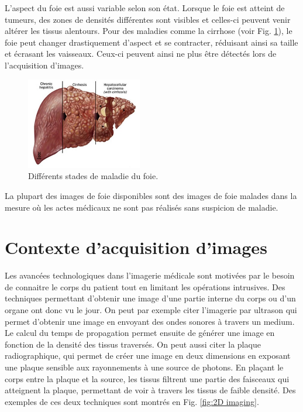 L'aspect du foie est aussi variable selon son état. Lorsque le foie est atteint de tumeurs, des zones de densités différentes sont visibles et celles-ci peuvent venir altérer les tissus alentours. Pour des maladies comme la cirrhose (voir Fig. \ref{fig:unhealthy liver}), le foie peut changer drastiquement d'aspect et se contracter, réduisant ainsi sa taille et écrasant les vaisseaux. Ceux-ci peuvent ainsi ne plus être détectés lors de l'acquisition d'images. 

\begin{figure}
    \centering
    \includegraphics[height=4cm]{Images/Liver_cirrhosis_stages.jpg}
    \caption{Différents stades de maladie du foie.}
    \label{fig:unhealthy liver}
\end{figure}


La plupart des images de foie disponibles sont des images de foie malades dans la mesure où les actes médicaux ne sont pas réalisés sans suspicion de maladie.

\section{Contexte d'acquisition d'images}
\label{sec:contexte:images}

Les avancées technologiques dans l'imagerie médicale sont motivées par le besoin de connaitre le corps du patient tout en limitant les opérations intrusives. Des techniques permettant d'obtenir une image d'une partie interne du corps ou d'un organe ont donc vu le jour. On peut par exemple citer l'imagerie par ultrason qui permet d'obtenir une image en envoyant des ondes sonores à travers un medium. Le calcul du temps de propagation permet ensuite de générer une image en fonction de la densité des tissus traversés. On peut aussi citer la plaque radiographique, qui permet de créer une image en deux dimensions en exposant une plaque sensible aux rayonnements à une source de photons. En plaçant le corps entre la plaque et la source, les tissus filtrent une partie des faisceaux qui atteignent la plaque, permettant de voir à travers les tissus de faible densité. Des exemples de ces deux techniques sont montrés en Fig. \ref{fig:2D imaging}.

